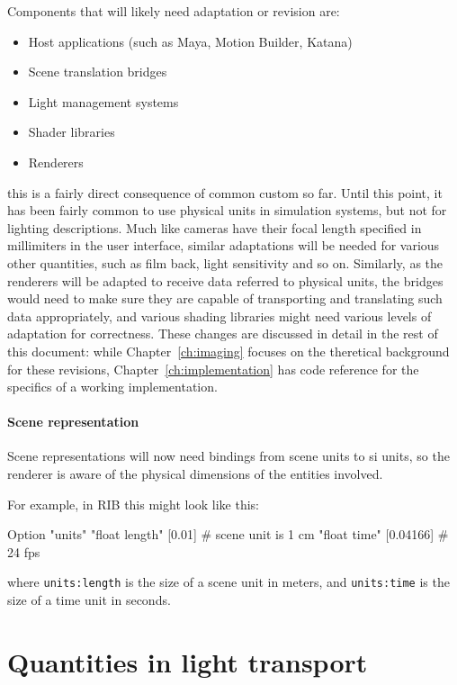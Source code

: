 Components that will likely need adaptation or revision are:

\begin{itemize}
\item Host applications (such as Maya, Motion Builder, Katana)
\item Scene translation bridges
\item Light management systems
\item Shader libraries
\item Renderers
\end{itemize}
this is a fairly direct consequence of common custom so far. Until this point, it has been
fairly common to use physical units in simulation systems, but not for lighting descriptions.
Much like cameras have their focal length specified in millimiters in the user interface,
similar adaptations will be needed for various other quantities, such as film back, light 
sensitivity and so on. Similarly, as the renderers will be adapted to receive data
referred to physical units, the bridges would need to make sure they are capable of transporting
and translating such data appropriately, and various shading libraries might need various levels
of adaptation for correctness. These changes are discussed in detail in the rest of this document:
while Chapter~\ref{ch:imaging} focuses on the theretical background for these revisions,
Chapter~\ref{ch:implementation} has code reference for the specifics of a working implementation.

\paragraph{Scene representation}

Scene representations will now need bindings from scene units to \gls{si} units,
so the renderer is aware of the physical dimensions of the entities involved.

For example, in \gls{RIB} this might look like this:

\begin{ribcode}
Option "units" "float length" [0.01]    # scene unit is 1 cm
               "float time"   [0.04166] # 24 fps
\end{ribcode}
where \Verb/units:length/ is the size of a scene unit in meters,
and \Verb/units:time/ is the size of a time unit in seconds.

\section{Quantities in light transport}

